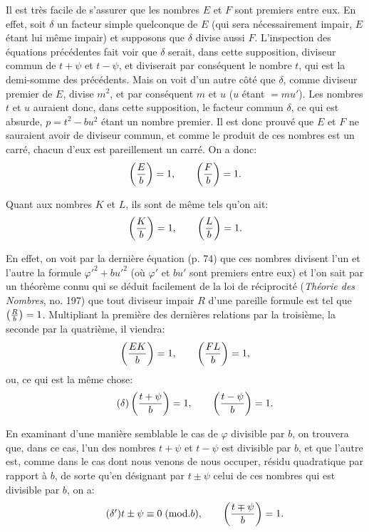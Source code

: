 \par\noindent
Il est très facile de s'assurer que les nombres $E$ et $F$ sont premiers entre eux. En effet, soit
$\delta$ un facteur simple quelconque de $E$ (qui sera nécessairement impair, $E$ étant lui même
impair) et supposons que $\delta$ divise aussi $F$. L'inspection des équations précédentes fait
voir que $\delta$ serait, dans cette supposition, diviseur commun de $t+\psi$ et $t-\psi$, et
diviserait par conséquent le nombre $t$, qui est la demi-somme des précédents. Mais on voit d'un
autre côté que $\delta$, comme diviseur premier de $E$, divise $m^2$, et par conséquent $m$ et $u$
($u$ étant $=mu'$). Les nombres $t$ et $u$ auraient donc, dans cette supposition, le facteur
commun $\delta$, ce qui est absurde, $p=t^2-bu^2$ étant un nombre premier. Il est donc prouvé que
$E$ et $F$ ne sauraient avoir de diviseur commun, et comme le produit de ces nombres est un carré,
chacun d'eux est pareillement un carré. On a donc:
\[
\left(\frac{E}{b}\right)=1,\qquad \left(\frac{F}{b}\right)=1.
\]
\par\noindent
Quant aux nombres $K$ et $L$, ils sont de même tels qu'on ait:
\[
\left(\frac{K}{b}\right)=1,\qquad \left(\frac{L}{b}\right)=1.
\]
\par\noindent
En effet, on voit par la dernière équation (p. 74) que ces nombres divisent l'un et l'autre la
formule $\varphi'^2+bu'^2$ (où $\varphi'$ et $bu'$ sont premiers entre eux) et l'on sait par un
théorème connu qui se déduit facilement de la loi de réciprocité (\emph{Théorie des Nombres}, no.
197) que tout diviseur impair $R$ d'une pareille formule est tel que $\left(\frac{R}{b}\right)=1$. Multipliant
la première des dernières relations par la troisième, la seconde par la quatrième, il viendra:
\[
\left(\frac{EK}{b}\right)=1,\qquad \left(\frac{FL}{b}\right)=1,
\]
ou, ce qui est la même chose:
\begin{equation*}\tag{$\delta$}
\left(\frac{t+\psi}{b}\right)=1,\qquad \left(\frac{t-\psi}{b}\right)=1.
\end{equation*}
\par\noindent
En examinant d'une manière semblable le cas de $\varphi$ divisible par $b$, on trouvera que, dans
ce cas, l'un des nombres $t+\psi$ et $t-\psi$ est divisible par $b$, et que l'autre est, comme
dans le cas dont nous venons de nous occuper, résidu quadratique par rapport à $b$, de sorte qu'en
désignant par $t\pm\psi$ celui de ces nombres qui est divisible par $b$, on a:
\begin{equation*}\tag{$\delta'$}
t\pm\psi\equiv0\;(\mathrm{mod}.b),\qquad
\left(\frac{t\mp\psi}{b}\right)=1.
\end{equation*}
